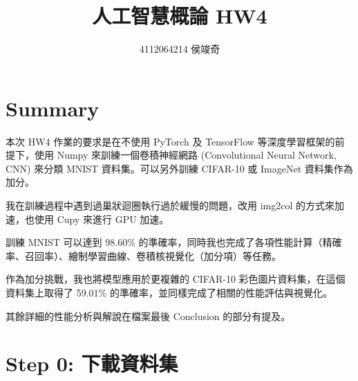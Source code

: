 \documentclass[11pt]{article}
\title{人工智慧概論 HW4}
\author{4112064214 侯竣奇}
\begin{document}
    
    \maketitle
    
    

    
    \section{Summary}\label{summary}

    本次 HW4 作業的要求是在不使用 PyTorch 及 TensorFlow
等深度學習框架的前提下，使用 Numpy 來訓練一個卷積神經網路 (Convolutional
Neural Network, CNN) 來分類 MNIST 資料集。可以另外訓練 CIFAR-10 或
ImageNet 資料集作為加分。

我在訓練過程中遇到過巢狀迴圈執行過於緩慢的問題，改用 img2col
的方式來加速，也使用 Cupy 來進行 GPU 加速。

訓練 MNIST 可以達到 98.60\%
的準確率，同時我也完成了各項性能計算（精確率、召回率）、繪制學習曲線、卷積核視覺化（加分項）等任務。

作為加分挑戰，我也將模型應用於更複雜的 CIFAR-10
彩色圖片資料集，在這個資料集上取得了 59.01\%
的準確率，並同樣完成了相關的性能評估與視覺化。

其餘詳細的性能分析與解說在檔案最後 Conclusion 的部分有提及。

    \section{Step 0:
下載資料集}\label{step-0-ux4e0bux8f09ux8cc7ux6599ux96c6}
\end{document}

